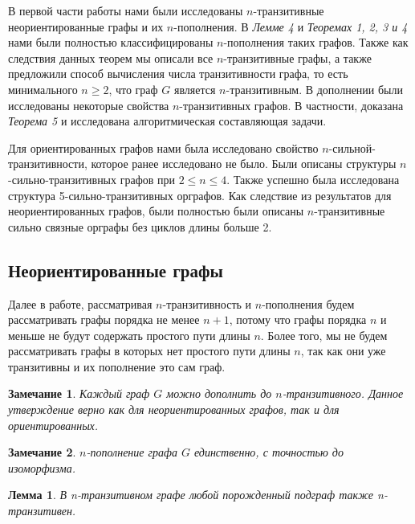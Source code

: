 \documentclass[a4paper,12pt]{article}
\theoremstyle{plain}
\newtheorem{lemma}{Лемма}
\theoremstyle{definition}
\newtheorem{remark}{Замечание}
\begin{document}
	В первой части работы нами были исследованы $n$-транзитивные неориентированные графы и их $n$-пополнения. В \emph{Лемме 4} и \emph{Теоремах 1, 2, 3 и 4} нами были полностью классифицированы $n$-пополнения таких графов. Также как следствия данных теорем мы описали все $n$-транзитивные графы, а также предложили способ вычисления числа транзитивности графа, то есть минимального $n\geq 2$, что граф $G$ является $n$-транзитивным. В дополнении были исследованы некоторые свойства $n$-транзитивных графов. В частности, доказана \emph{Теорема 5} и исследована алгоритмическая составляющая задачи.
	
	
	Для ориентированных графов нами была исследовано свойство $n$-сильной-транзитивности, которое ранее исследовано не было. Были описаны структуры $n$-сильно-транзитивных графов при $ 2 \leq n \leq 4$. Также успешно была исследована структура 5-сильно-транзитивных орграфов. Как следствие из результатов для неориентированных графов, были полностью были описаны $n$-транзитивные сильно связные орграфы без циклов длины больше 2.
	
	
	
	
	\newpage
	
	\begin{center}
	    \section{Неориентированные графы}
	\end{center}
	
	
	Далее в работе, рассматривая $n$-транзитивность и $n$-пополнения будем рассматривать графы порядка не менее $n+1$, потому что графы порядка $n$ и меньше не будут содержать простого пути длины $n$. Более того, мы не будем рассматривать графы в которых нет простого пути длины $n$, так как они уже транзитивны и их пополнение это сам граф.
	\\
	\begin{remark}
		{\it Каждый граф  $G$ можно дополнить до $n$-транзитивного. Данное утверждение верно как для неориентированных графов, так и для ориентированных.}
	\end{remark}
	
	
	\begin{remark}
		{\it $n$-пополнение графа $G$ единственно, с точностью до изоморфизма.}
	\end{remark} 
	
	
	\begin{lemma} \label{l1}
		{\it В n-транзитивном графе любой порожденный подграф также n-транзитивен.}
	\end{lemma}
	
\end{document}
